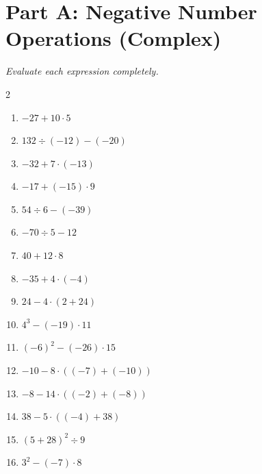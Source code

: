 \documentclass[11pt]{article}
\begin{document}
\section*{Part A: Negative Number Operations (Complex)}
\noindent\textit{Evaluate each expression completely.}
\begin{multicols}{2}
\begin{enumerate}
  \item $-27 + 10 \cdot 5$
  \vspace{1.3cm}
  \item $132 \div (-12) - (-20)$
  \vspace{1.3cm}
  \item $-32 + 7 \cdot (-13)$
  \vspace{1.3cm}
  \item $-17 + (-15) \cdot 9$
  \vspace{1.3cm}
  \item $54 \div 6 - (-39)$
  \vspace{1.3cm}
  \item $-70 \div 5 - 12$
  \vspace{1.3cm}
  \item $40 + 12 \cdot 8$
  \vspace{1.3cm}
  \item $-35 + 4 \cdot (-4)$
  \vspace{1.3cm}
  \item $24 - 4 \cdot (2 + 24)$
  \vspace{1.3cm}
  \item $4^{3} - (-19) \cdot 11$
  \vspace{1.3cm}
  \item $(-6)^{2} - (-26) \cdot 15$
  \vspace{1.3cm}
  \item $-10 - 8 \cdot ((-7) + (-10))$
  \vspace{1.3cm}
  \item $-8 - 14 \cdot ((-2) + (-8))$
  \vspace{1.3cm}
  \item $38 - 5 \cdot ((-4) + 38)$
  \vspace{1.3cm}
  \item $(5 + 28)^{2} \div 9$
  \vspace{1.3cm}
  \item $3^{2} - (-7) \cdot 8$
  \vspace{1.3cm}
\end{enumerate}
\end{multicols}
\end{document}
